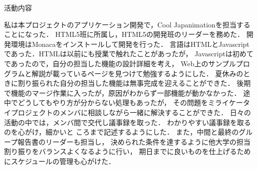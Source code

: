\par 
活動内容
\par
私は本プロジェクトのアプリケーション開発で，Cool Japanimationを担当することになった．
HTML5班に所属し，HTML5の開発班のリーダーを務めた．
開発環境はMonacaをインストールして開発を行った．
言語はHTMLとJavascriptであった．HTMLは以前にも授業で触れたことがあったが，
Javascriptは初めてであったので，自分の担当した機能の設計詳細を考え，
Web上のサンプルプログラムと解説が載っているページを見つけて勉強するようにした．
夏休みのときに割り振られた自分の担当した機能は無事完成を迎えることができた．
後期で機能のマージ作業に入ったが，原因がわからず一部機能が動かなかった．
途中でどうしてもやり方が分からない処理もあったが，
その問題をミライケータイプロジェクトのメンバに相談しながら一緒に解決することができた．
日々の活動の中では，メンバ間で交代し議事録を取った．
わかりやすい議事録を取るのを心がけ，細かいと
ころまで記述するようにした．
また，中間と最終のグループ報告書のリーダーも担当し，
決められた条件を達するように他大学の担当割り振りをバランスよくなるように行い，
期日までに良いものを仕上げるためにスケジュールの管理も心がけた．
